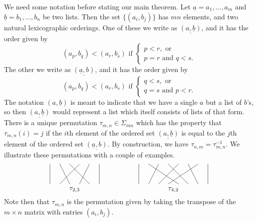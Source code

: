 \documentclass{amsbook} %
\numberwithin{section}{chapter}
\begin{document}
We need some notation before stating our main theorem.  Let $\underline{a} = a_{1}, \ldots , a_{m}$ and $\underline{b} = b_{1}, \ldots, b_{n}$ be two lists.  Then the set $\{ (a_{i}, b_{j})\}$ has $mn$ elements, and two natural lexicographic orderings.  One of these we write as $\underline{(a, \underline{b})}$, and it has the order given by
\[
(a_{p}, b_{q}) < (a_{r}, b_{s}) \textrm{ if } \left\{ \begin{array}{l} p < r, \textrm{ or } \\ p=r \textrm{ and } q < s. \end{array} \right.
\]
The other we write as $\underline{(\underline{a}, b)}$, and it has the order given by
\[
(a_{p}, b_{q}) < (a_{r}, b_{s}) \textrm{ if } \left\{ \begin{array}{l} q < s, \textrm{ or } \\ q=s \textrm{ and } p < r. \end{array} \right.
\]
The notation $(a, \underline{b})$ is meant to indicate that we have a single $a$ but a list of $b$'s, so then $\underline{(a, \underline{b})}$ would represent a list which itself consists of lists of that form. There is a unique permutation $\tau_{m,n} \in \Sigma_{mn}$ which has the property that $\tau_{m,n}(i) = j$ if the $i$th element of the ordered set $\underline{(a, \underline{b})}$ is equal to the $j$th element of the ordered set $\underline{(\underline{a}, b)}$.  By construction, we have $\tau_{n,m} = \tau_{m,n}^{-1}$. We illustrate these permutations with a couple of examples.
    \[
        \xy
            {\ar@{-} (0,0) ; (0,-10)};
            {\ar@{-} (5,0) ; (10,-10)};
            {\ar@{-} (10,0) ; (20,-10)};
            {\ar@{-} (15,0) ; (5,-10)};
            {\ar@{-} (20,0) ; (15,-10)};
            {\ar@{-} (25,0) ; (25,-10)};
            (12.5,-13)*{\tau_{2,3}};
            {\ar@{-} (45,0) ; (45,-10)};
            {\ar@{-} (50,0) ; (65,-10)};
            {\ar@{-} (55,0) ; (50,-10)};
            {\ar@{-} (60,0) ; (70,-10)};
            {\ar@{-} (65,0) ; (55,-10)};
            {\ar@{-} (70,0) ; (75,-10)};
            {\ar@{-} (75,0) ; (60,-10)};
            {\ar@{-} (80,0) ; (80,-10)};
            (62.5,-13)*{\tau_{4,2}}
        \endxy
    \]
Note then that $\tau_{m,n}$ is the permutation given by taking the transpose of the $m \times n$ matrix with entries $(a_{i}, b_{j})$.
\end{document}
